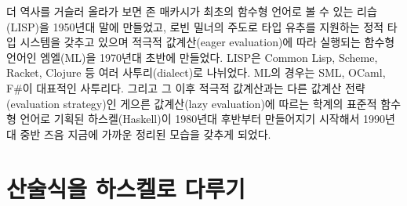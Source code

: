 %
%
더 역사를 거슬러 올라가 보면 존 매카시가 최초의 함수형 언어로 볼 수 있는
%
%
리습(LISP)을 1950년대 말에 만들었고, 로빈 밀너의 주도로 타입 유추를
지원하는 정적 타입 시스템을 갖추고 있으며
%
%
적극적 값계산(eager evaluation)에
따라 실행되는 함수형 언어인 엠엘(ML)을 1970년대 초반에 만들었다.
LISP은 Common Lisp, Scheme, Racket, Clojure 등 여러 사투리(dialect)로 나뉘었다.
%
ML의 경우는 SML, OCaml, F\#이 대표적인 사투리다. 그리고 그 이후
적극적 값계산과는 다른
%
%
값계산 전략(evaluation strategy)인
%
%
게으른 값계산(lazy evaluation)에 따르는 학계의 표준적 함수형 언어로 기획된
%
%
하스켈(Haskell)이 1980년대 후반부터 만들어지기 시작해서 1990년대 중반 즈음 
지금에 가까운 정리된 모습을 갖추게 되었다\cite{Hudak2007HistoryHaskell}.




\chapter{산술식을 하스켈로 다루기}\label{chap:ArithExpr}




